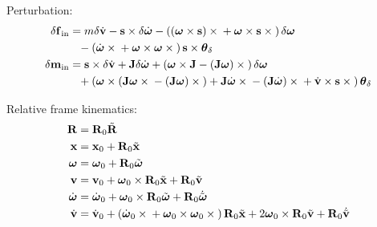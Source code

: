 \documentclass[10pt,dvips,fleqn,subeqn]{report}
\newcommand{\T}[1]{\bm{\mathbf{#1}}}
\newcommand{\TT}[1]{\bm{\mathbf{#1}}}
\begin{document}
Perturbation:
\begin{subequations}
\begin{align}
	\delta \T{f}_{\text{in}}
	&=
	m \delta \dot{\T{v}}
	- \T{s} \times \delta \dot{\T{\omega}}
	- \plbr{
		\plbr{\T{\omega} \times \T{s}} \times {}
		+ \T{\omega} \times \T{s} \times{}
	} \delta\T{\omega}
	\nonumber \\ &\hphantom{=}
	- \plbr{
		\dot{\T{\omega}} \times{}
		+ \T{\omega} \times \T{\omega} \times{}
	} \T{s} \times \T{\theta}_{\delta} \\
%
	\delta\T{m}_{\text{in}} &=
	\T{s} \times \delta\dot{\T{v}}
	+ \TT{J} \delta\dot{\T{\omega}}
	+ \plbr{
		\T{\omega} \times \TT{J}
		- \plbr{\TT{J} \T{\omega}} \times{}
	} \delta\T{\omega}
	\nonumber \\ &\hphantom{=}
	+ \plbr{
		\T{\omega} \times \plbr{
			\TT{J} \T{\omega} \times {}
			- \plbr{\TT{J} \T{\omega}} \times{}
		}
		+ \TT{J} \dot{\T{\omega}} \times{}
		- \plbr{\TT{J} \dot{\T{\omega}}} \times {}
		+ \dot{\T{v}} \times \T{s} \times {}
	} \T{\theta}_{\delta}
\end{align}
\end{subequations}

Relative frame kinematics:
\begin{subequations}
\begin{align}
	\TT{R} &= \TT{R}_0 \tilde{\TT{R}} \\
	\T{x} &= \T{x}_0
		+ \TT{R}_0 \tilde{\T{x}} \\
	\T{\omega} &= \T{\omega}_0
		+ \TT{R}_0 \tilde{\T{\omega}} \\
	\T{v} &= \T{v}_0
		+ \T{\omega}_0 \times \TT{R}_0 \tilde{\T{x}}
		+ \TT{R}_0 \tilde{\T{v}} \\
	\dot{\T{\omega}} &= \dot{\T{\omega}}_0
		+ \T{\omega}_0 \times \TT{R}_0 \tilde{\T{\omega}} 
		+ \TT{R}_0 \dot{\tilde{\T{\omega}}} \\
	\dot{\T{v}} &= \dot{\T{v}}_0
		+ \plbr{
			\dot{\T{\omega}}_0 \times{}
			+ \T{\omega}_0 \times \T{\omega}_0 \times{}
		} \TT{R}_0 \tilde{\T{x}}
		+ 2 \T{\omega}_0 \times \TT{R}_0 \tilde{\T{v}}
		+ \TT{R}_0 \dot{\tilde{\T{v}}}
\end{align}
\end{subequations}
\end{document}
